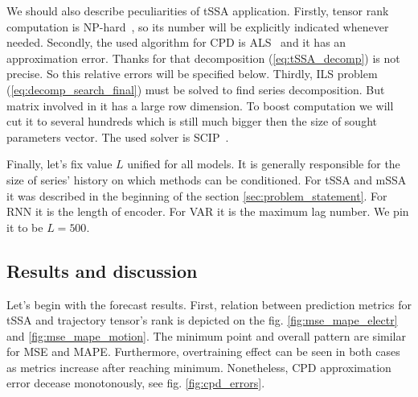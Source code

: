 \documentclass[referee, pdflatex]{sn-jnl}
\theoremstyle{definition}
\theoremstyle{plain}
\begin{document}
	We should also describe peculiarities of tSSA application. Firstly, tensor rank computation is NP-hard~\cite{HASTAD1990644}, so its number will be explicitly indicated whenever needed. Secondly, the used algorithm for CPD is ALS~\cite{kolda_tensors} and it has an approximation error. Thanks for that decomposition (\ref{eq:tSSA_decomp}) is not precise. So this relative errors will be specified below. Thirdly, ILS problem (\ref{eq:decomp_search_final}) must be solved to find series decomposition. But matrix involved in it has a large row dimension. To boost computation we will cut it to several hundreds which is still much bigger then the size of sought parameters vector. The used solver is SCIP~\cite{BolusaniEtal2024ZR}.

	Finally, let's fix value $ L $ unified for all models. It is generally responsible for the size of series' history on which methods can be conditioned. For tSSA and mSSA it was described in the beginning of the section \ref{sec:problem_statement}. For RNN it is the length of encoder. For VAR it is the maximum lag number. We pin it to be $ L = 500 $.
	
	\subsection{Results and discussion}
	
	Let's begin with the forecast results. First, relation between prediction metrics for tSSA and trajectory tensor's rank is depicted on the fig. \ref{fig:mse_mape_electr} and \ref{fig:mse_mape_motion}. The minimum point and overall pattern are similar for MSE and MAPE. Furthermore, overtraining effect can be seen in both cases as metrics increase after reaching minimum. Nonetheless, CPD approximation error decease monotonously, see fig. \ref{fig:cpd_errors}.
	
\end{document}
